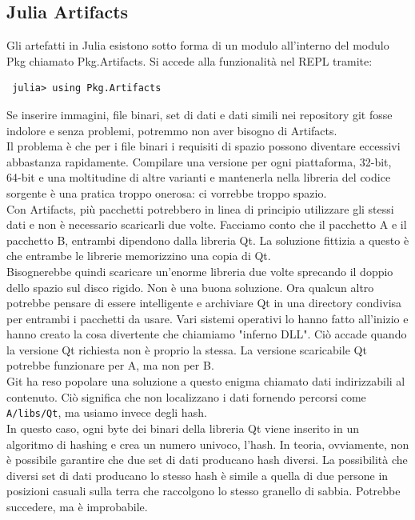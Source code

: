 \documentclass[a4paper]{extreport}
\begin{document}
\begin{multicols*}{2}
\section{Julia Artifacts}
Gli artefatti\cite{artifacts} in Julia esistono sotto forma di un modulo all'interno del modulo Pkg chiamato Pkg.Artifacts. Si accede alla funzionalità nel REPL tramite:
\begin{verbatim}
 julia> using Pkg.Artifacts    
\end{verbatim}
Se inserire immagini, file binari, set di dati e dati simili nei repository git fosse indolore e senza problemi, potremmo non aver bisogno di Artifacts.\\
Il problema è che per i file binari i requisiti di spazio possono diventare eccessivi abbastanza rapidamente.
Compilare una versione per ogni piattaforma, 32-bit, 64-bit e una moltitudine di altre varianti e mantenerla nella libreria del codice sorgente è una pratica troppo onerosa: ci vorrebbe troppo spazio.\\
Con Artifacts, più pacchetti potrebbero in linea di principio utilizzare gli stessi dati e non è necessario scaricarli due volte. Facciamo conto che il pacchetto A e il pacchetto B, entrambi dipendono dalla libreria Qt. La soluzione fittizia a questo è che entrambe le librerie memorizzino una copia di Qt.\\
Bisognerebbe quindi scaricare un'enorme libreria due volte sprecando il doppio dello spazio sul disco rigido. Non è una buona soluzione. Ora qualcun altro potrebbe pensare di essere intelligente e archiviare Qt in una directory condivisa per entrambi i pacchetti da usare. Vari sistemi operativi lo hanno fatto all'inizio e hanno creato la cosa divertente che chiamiamo "inferno DLL". Ciò accade quando la versione Qt richiesta non è proprio la stessa. La versione scaricabile Qt potrebbe funzionare per A, ma non per B.\\
Git ha reso popolare una soluzione a questo enigma chiamato dati indirizzabili al contenuto. Ciò significa che non localizzano i dati fornendo percorsi come \verb|A/libs/Qt|, ma usiamo invece degli hash.\\
In questo caso, ogni byte dei binari della libreria Qt viene inserito in un algoritmo di hashing e crea un numero univoco, l'hash. In teoria, ovviamente, non è possibile garantire che due set di dati producano hash diversi. La possibilità che diversi set di dati producano lo stesso hash è simile a quella di due persone in posizioni casuali sulla terra che raccolgono lo stesso granello di sabbia. Potrebbe succedere, ma è improbabile.\\

\end{multicols*}
\end{document}
